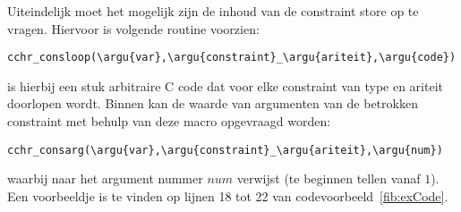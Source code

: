 Uiteindelijk moet het mogelijk zijn de inhoud van de constraint store op te vragen. Hiervoor is volgende routine voorzien: \begin{Verbatim}[commandchars=\\\{\}]
  cchr_consloop(\argu{var},\argu{constraint}_\argu{ariteit},\argu{code})
\end{Verbatim}
 is hierbij een stuk arbitraire C code dat voor elke constraint van type  en ariteit  doorlopen wordt. Binnen  kan de waarde van argumenten van de betrokken constraint met behulp van deze macro opgevraagd worden: \begin{Verbatim}[commandchars=\\\{\}]
  cchr_consarg(\argu{var},\argu{constraint}_\argu{ariteit},\argu{num})
\end{Verbatim}
waarbij  naar het argument nummer $num$ verwijst (te beginnen tellen vanaf $1$). Een voorbeeldje is te vinden op lijnen 18 tot 22 van codevoorbeeld~\ref{fib:exCode}.
